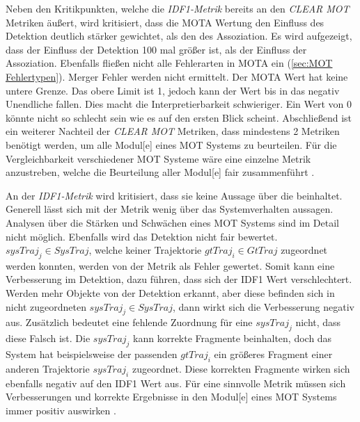Neben den Kritikpunkten, welche die \textit{\gls{IDF1}-Metrik} bereits an den \textit{\acrshort{CLEAR} \gls{MOT}} Metriken äußert, wird kritisiert, dass die \gls{MOTA} Wertung den Einfluss des \gls{Detektion} deutlich stärker gewichtet, als den des \gls{Assoziation}. Es wird aufgezeigt, dass der Einfluss der \gls{Detektion} 100 mal größer ist, als der Einfluss der \gls{Assoziation}. Ebenfalls fließen nicht alle Fehlerarten in \gls{MOTA} ein (\ref{sec:MOT Fehlertypen}). Merger Fehler werden nicht ermittelt. Der \gls{MOTA} Wert hat keine untere Grenze. Das obere Limit ist 1, jedoch kann der Wert bis in das negativ Unendliche fallen. Dies macht die Interpretierbarkeit schwieriger. Ein Wert von 0 könnte nicht so schlecht sein wie es auf den ersten Blick scheint. Abschließend ist ein weiterer Nachteil der \textit{\acrshort{CLEAR} \gls{MOT}} Metriken, dass mindestens 2 Metriken benötigt werden, um  alle \gls{Modul}[e] eines \gls{MOT} Systems zu beurteilen. Für die Vergleichbarkeit verschiedener \gls{MOT} Systeme wäre eine einzelne Metrik anzustreben, welche die Beurteilung aller \gls{Modul}[e] fair zusammenführt \cite{HOTA}.\par

An der \textit{\gls{IDF1}-Metrik} wird kritisiert, dass sie keine Aussage über die  beinhaltet. Generell lässt sich mit der Metrik wenig über das Systemverhalten aussagen. Analysen über die Stärken und Schwächen eines \gls{MOT} Systems sind im Detail nicht möglich. Ebenfalls wird das \gls{Detektion} nicht fair bewertet. \(sysTraj_j \in SysTraj\), welche keiner \gls{Trajektorie} \(gtTraj_i \in GtTraj\) zugeordnet werden konnten, werden von der Metrik als Fehler gewertet. Somit kann eine Verbesserung im \gls{Detektion}, dazu führen, dass sich der \gls{IDF1} Wert verschlechtert. Werden mehr Objekte von der \gls{Detektion} erkannt, aber diese befinden sich in nicht zugeordneten \(sysTraj_j \in SysTraj\), dann wirkt sich die Verbesserung negativ aus. Zusätzlich bedeutet eine fehlende Zuordnung für eine \(sysTraj_j\) nicht, dass diese Falsch ist. Die \(sysTraj_j\) kann korrekte Fragmente beinhalten, doch das System hat beispielsweise der passenden \(gtTraj_i\) ein größeres Fragment einer anderen \gls{Trajektorie} \(sysTraj_i\) zugeordnet. Diese korrekten Fragmente wirken sich ebenfalls negativ auf den \gls{IDF1} Wert aus. Für eine sinnvolle Metrik müssen sich Verbesserungen und korrekte Ergebnisse in den \gls{Modul}[e] eines \gls{MOT} Systems immer positiv auswirken \cite{HOTA}. \par

